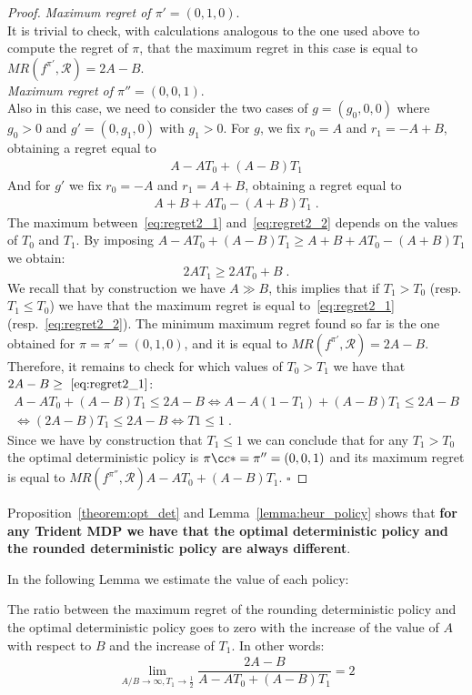 \begin{proof}
\textit{Maximum regret of $\pi' = (0, 1, 0)$}.\\
It is trivial to check, with calculations analogous to the one used above to compute the regret of $\pi$, that the maximum regret in this case is equal to $MR(f^{\pi'}, \mathcal{R}) = 2A-B$.\\


\textit{Maximum regret of $\pi'' = (0, 0, 1)$}.\\
Also in this case, we need to consider the two cases of $g =(g_0, 0 ,0)$ where $g_0 > 0$ and $g' = (0, g_1, 0)$ with $g_1 > 0$. For $g$, we fix $r_0 = A$ and $r_1 = -A+B$, obtaining a regret equal to 
\begin{align}
A- A T_0 +(A-B) T_1 \label{eq:regret2_1}
\end{align}
And for $g'$ we fix $r_0 = -A$ and $r_1 = A+B$, obtaining a regret equal to 
\begin{align}
A+B+A T_0 -(A+B) T_1\;. \label{eq:regret2_2}
\end{align}
The maximum between~\eqref{eq:regret2_1} and~\eqref{eq:regret2_2} depends on the values of $T_0$ and $T_1$.
By imposing  $A- A T_0 +(A-B) T_1 \geq A+B+A T_0 -(A+B) T_1$ we obtain:
$$ 2A T_1 \geq 2 A T_0 + B\;. $$
We recall that by construction we have $A \gg B$, this implies that if $T_1> T_0$ (resp. $T_1\leq T_0$)  we have that the maximum regret is equal to~\eqref{eq:regret2_1} (resp.~\eqref{eq:regret2_2}).
The minimum maximum regret found so far is the one obtained for $\pi = \pi' = (0, 1, 0)$, and it is equal to $MR(f^{\pi'}, \mathcal{R}) = 2A-B$. Therefore, it remains to check for which values of $T_0 > T_1$ we have that $2A-B \geq~\eqref{eq:regret2_1}$:
\begin{align*}
A- A T_0 +(A-B) T_1 \leq 2A - B \Leftrightarrow A- A (1-T_1) +(A-B) T_1 \leq 2A - B\\
  \Leftrightarrow (2A-B)T_1 \leq 2A-B  \Leftrightarrow T1 \leq 1\;.
\end{align*}
 Since we have by construction that $T_1 \leq1$ we can conclude that for any $T_1> T_0$ the optimal deterministic policy is $\piç* = \pi''= (0, 0,1)$ and its maximum regret is equal to $MR(f^{\pi''}, \mathcal{R})A- A T_0 +(A-B) T_1$. $\square$
\end{proof}

\begin{remark}
Proposition~\ref{theorem:opt_det} and Lemma~\ref{lemma:heur_policy} shows that \textbf{for any Trident MDP we have that the optimal deterministic policy and the rounded deterministic policy are always different}. 
\end{remark}
In the following Lemma we estimate the value of each policy:

\begin{lemma}
The ratio between the maximum regret of the rounding deterministic policy and the optimal deterministic policy goes to zero with the increase of the value of $A$ with respect to $B$ and the increase of $T_1$. In other words:  
\begin{align*}
\lim_{A/B \rightarrow \infty, T_1 \rightarrow \frac{1}{2}} \dfrac{2A-B}{A- A T_0 +(A-B) T_1} = 2
\end{align*}
\end{lemma}